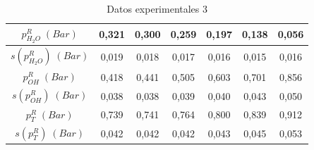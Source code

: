 \documentclass[a4paper,12pt,titlepage]{article}
\begin{document}
\begin{table}[]
\begin{tabular}{|c|c|c|c|c|c|c|}
$p_{H_2O}^R \;(Bar)$         & 0,321  & 0,300  & 0,259  & 0,197  & 0,138  & 0,056  \\ \hline
$s(p_{H_2O}^R) \;(Bar)$      & 0,019  & 0,018  & 0,017  & 0,016  & 0,015  & 0,016  \\ \hline
$p_{OH}^R \;(Bar)$           & 0,418  & 0,441  & 0,505  & 0,603  & 0,701  & 0,856  \\ \hline
$s(p_{OH}^R) \;(Bar)$        & 0,038  & 0,038  & 0,039  & 0,040  & 0,043  & 0,050  \\ \hline
$p_{T}^R \;(Bar)$            & 0,739  & 0,741  & 0,764  & 0,800  & 0,839  & 0,912  \\ \hline
$s(p_{T}^R) \;(Bar)$         & 0,042  & 0,042  & 0,042  & 0,043  & 0,045  & 0,053  \\ \hline
\end{tabular}
\caption{Datos experimentales 3}
\label{tab:my-table}
\end{table}
\end{document}
